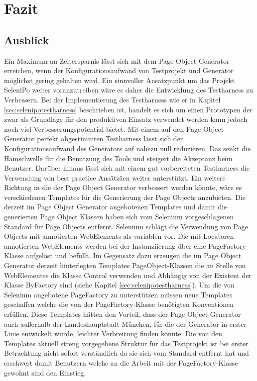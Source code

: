 \chapter{Fazit}
\label{sec:fazit}

\section{Ausblick}
\label{ausblick}
Ein Maximum an Zeitersparnis lässt sich mit dem Page Object Generator erreichen, wenn der Konfigurationsaufwand von Testprojekt und Generator möglichst gering gehalten wird.
Ein sinnvoller Ansatzpunkt um das Projekt SeleniPo weiter voranzutreiben wäre es daher die Entwicklung des Testharness zu Verbessern. Bei der Implementierung des Testharness wie er in Kapitel \ref{sec:selenipotestharness} beschrieben ist, handelt es sich um einen Prototypen der zwar als Grundlage für den produktiven Einsatz verwendet werden kann jedoch noch viel Verbesserungspotential bietet. Mit einem auf den Page Object Generator perfekt abgestimmten Testharness lässt sich der Konfigurationsaufwand des Generators auf nahezu null reduzieren. Das senkt die Hämschwelle für die Benutzung des Tools und steigert die Akzeptanz beim Benutzer.
Darüber hinaus lässt sich mit einem gut vorbereiteten Testharness die Verwendung von best practice Ansätzäen weiter unterstützt.
Ein weitere Richtung in die der Page Object Generator verbessert werden könnte, wäre es verschiedenen Templates für die Generierung der Page Objects anzubieten.
Die derzeit im Page Object Generator angebotenen Templates und damit die generierten Page Object Klassen haben sich vom Selenium vorgeschlagenen Standard für Page Objects entfernt. Selenium schlägt die Verwendung von Page Objects mit annotierten WebElements als variablen vor. Die mit Locatoren annotierten WebElements werden bei der Instanziierung über eine PageFactory-Klasse aufgelöst und befüllt.
Im Gegensatz dazu erzeugen die im Page Object Generator derzeit hinterlegten Templates PageObject-Klassen die an Stelle von WebElementes die Klasse Control verwenden und Abhängig von der Existent der Klasse ByFactory sind (siehe Kapitel \ref{sec:selenipotestharness}). Um die von Selenium angebotene PageFactory zu unterstützen müssen neue Templates geschaffen welche die von der PageFactory-Klasse benötigten Konventionen erfüllen.
Diese Templates hätten den Vorteil, dass der Page Object Generator auch außerhalb der Landeshauptstadt München, für die der Generator in erster Linie entwickelt wurde, leichter Verbreitung finden könnte. Die von den Templates aktuell streng vorgegebene Struktur für das Testprojekt ist bei erster Betrachtung nicht sofort verständlich da sie sich vom Standard entfernt hat und erschwert damit Benutzern welche an die Arbeit mit der PageFactory-Klasse gewohnt sind den Einstieg.












